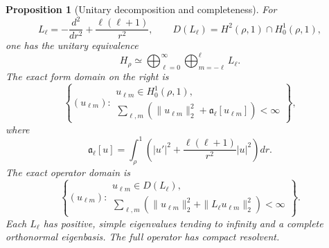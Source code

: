 \documentclass[11pt]{article}
\numberwithin{equation}{section}
\newtheorem{proposition}[theorem]{Proposition}
\theoremstyle{definition}
\theoremstyle{remark}
\begin{document}
\begin{proposition}[Unitary decomposition and completeness]
\label{prop:sc-separated-spectrum}
For
\[
  L_\ell=-\frac{d^2}{dr^2}+\frac{\ell(\ell+1)}{r^2},
  \qquad
  D(L_\ell)=H^2(\rho,1)\cap H_0^1(\rho,1),
\]
one has the unitary equivalence
\begin{equation}
  H_\rho\simeq
  \bigoplus_{\ell=0}^{\infty}
  \bigoplus_{m=-\ell}^{\ell}L_\ell.
  \label{eq:sc-operator-sum}
\end{equation}
The exact form domain on the right is
\begin{equation}
  \left\{(u_{\ell m}):
  \begin{array}{l}
  u_{\ell m}\in H_0^1(\rho,1),\\
  \displaystyle
  \sum_{\ell,m}\left(\|u_{\ell m}\|_2^2
  +\mathfrak a_\ell[u_{\ell m}]\right)<\infty
  \end{array}\right\},
  \label{eq:sc-global-form-domain}
\end{equation}
where
\[
  \mathfrak a_\ell[u]
  =\int_\rho^1\left(|u'|^2
  +\frac{\ell(\ell+1)}{r^2}|u|^2\right)dr.
\]
The exact operator domain is
\begin{equation}
  \left\{(u_{\ell m}):
  \begin{array}{l}
  u_{\ell m}\in D(L_\ell),\\
  \displaystyle
  \sum_{\ell,m}\left(\|u_{\ell m}\|_2^2
  +\|L_\ell u_{\ell m}\|_2^2\right)<\infty
  \end{array}\right\}.
  \label{eq:sc-global-operator-domain}
\end{equation}
Each \(L_\ell\) has positive, simple eigenvalues tending to infinity and a
complete orthonormal eigenbasis.  The full operator has compact resolvent.
\end{proposition}
\end{document}
